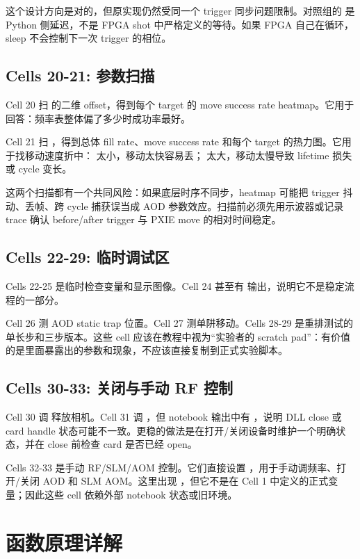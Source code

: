 \documentclass[11pt,oneside,openany]{book}
\begin{document}
这个设计方向是对的，但原实现仍然受同一个 trigger 同步问题限制。对照组的  是 Python 侧延迟，不是 FPGA shot 中严格定义的等待。如果 FPGA 自己在循环，sleep 不会控制下一次 trigger 的相位。

\section{Cells 20-21: 参数扫描}
Cell 20 扫  的二维 offset，得到每个 target 的 move success rate heatmap。它用于回答：频率表整体偏了多少时成功率最好。

Cell 21 扫 ，得到总体 fill rate、move success rate 和每个 target 的热力图。它用于找移动速度折中： 太小，移动太快容易丢； 太大，移动太慢导致 lifetime 损失或 cycle 变长。

这两个扫描都有一个共同风险：如果底层时序不同步，heatmap 可能把 trigger 抖动、丢帧、跨 cycle 捕获误当成 AOD 参数效应。扫描前必须先用示波器或记录 trace 确认 before/after trigger 与 PXIE move 的相对时间稳定。

\section{Cells 22-29: 临时调试区}
Cells 22-25 是临时检查变量和显示图像。Cell 24 甚至有  输出，说明它不是稳定流程的一部分。

Cell 26 测 AOD static trap 位置。Cell 27 测单阱移动。Cells 28-29 是重排测试的单长步和三步版本。这些 cell 应该在教程中视为“实验者的 scratch pad”：有价值的是里面暴露出的参数和现象，不应该直接复制到正式实验脚本。

\section{Cells 30-33: 关闭与手动 RF 控制}
Cell 30 调  释放相机。Cell 31 调 ，但 notebook 输出中有 ，说明 DLL close 或 card handle 状态可能不一致。更稳的做法是在打开/关闭设备时维护一个明确状态，并在 close 前检查 card 是否已经 open。

Cells 32-33 是手动 RF/SLM/AOM 控制。它们直接设置 ，用于手动调频率、打开/关闭 AOD 和 SLM AOM。这里出现 ，但它不是在 Cell 1 中定义的正式变量；因此这些 cell 依赖外部 notebook 状态或旧环境。

\chapter{函数原理详解}
\end{document}
